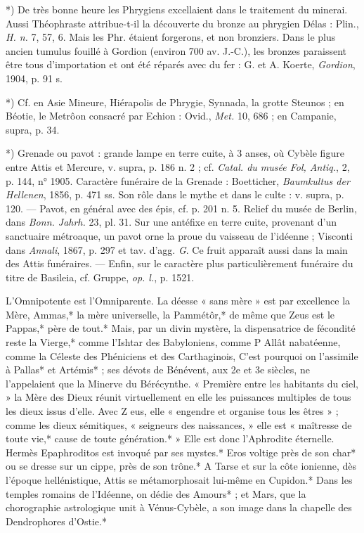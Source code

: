 \documentclass[a4paper, 11pt, oneside, polutonikogreek, french]{article}
\begin{document}
*) De très bonne heure les Phrygiens excellaient dans le traitement du minerai. Aussi Théophraste attribue-t-il la découverte du bronze au phrygien Délas : Plin., \emph{H. n.} 7, 57, 6. Mais les Phr. étaient forgerons, et non bronziers. Dans le plus ancien tumulus fouillé à Gordion (environ 700 av. J.-C.), les bronzes paraissent être tous d'importation et ont été réparés avec du fer : G. et A. Koerte, \emph{Gordion}, 1904, p. 91 s.

*) Cf. en Asie Mineure, Hiérapolis de Phrygie, Synnada, la grotte Steunos ; en Béotie, le Metrôon consacré par Echion : Ovid., \emph{Met.} 10, 686 ; en Campanie, supra, p. 34.

*) Grenade ou pavot : grande lampe en terre cuite, à 3 anses, où Cybèle figure entre Attis et Mercure, v. supra, p. 186 n. 2 ; cf. \emph{Catal. du musée Fol, Antiq.}, 2, p. 144, n° 1905. Caractère funéraire de la Grenade : Boetticher, \emph{Baumkultus der Hellenen}, 1856, p. 471 ss. Son rôle dans le mythe et dans le culte : v. supra, p. 120. --- Pavot, en général avec des épis, cf. p. 201 n. 5. Relief du musée de Berlin, dans \emph{Bonn. Jahrh.} 23, pl. 31. Sur une antéfixe en terre cuite, provenant d'un sanctuaire métroaque, un pavot orne la proue du vaisseau de l'idéenne ; Visconti dans \emph{Annali}, 1867, p. 297 et tav. d'agg. \emph{G}. Ce fruit apparaît aussi dans la main des Attis funéraires. --- Enfin, sur le caractère plus particulièrement funéraire du titre de Basileia, cf. Gruppe, \emph{op. l.}, p. 1521.

L'Omnipotente est l'Omniparente. La déesse « sans mère » est par excellence la Mère, Ammas,* la mère universelle, la Pammétôr,* de même que Zeus est le Pappas,* père de tout.* Mais, par un divin mystère, la dispensatrice de fécondité reste la Vierge,* comme l'Ishtar des Babyloniens, comme P Allât nabatéenne, comme la Céleste des Phéniciens et des Carthaginois, C'est pourquoi on l'assimile à Pallas* et Artémis* ; ses dévots de Bénévent, aux 2e et 3e siècles, ne l'appelaient que la Minerve du Bérécynthe. « Première entre les habitants du ciel, » la Mère des Dieux réunit virtuellement en elle les puissances multiples de tous les dieux issus d'elle. Avec Z eus, elle « engendre et organise tous les êtres » ; comme les dieux sémitiques, « seigneurs des naissances, » elle est « maîtresse de toute vie,* cause de toute génération.* » Elle est donc l'Aphrodite éternelle. Hermès Epaphroditos est invoqué par ses mystes.* Eros voltige près de son char* ou se dresse sur un cippe, près de son trône.* A Tarse et sur la côte ionienne, dès l'époque hellénistique, Attis se métamorphosait lui-même en Cupidon.* Dans les temples romains de l'Idéenne, on dédie des Amours* ; et Mars, que la chorographie astrologique unit à Vénus-Cybèle, a son image dans la chapelle des Dendrophores d'Ostie.*
\end{document}
